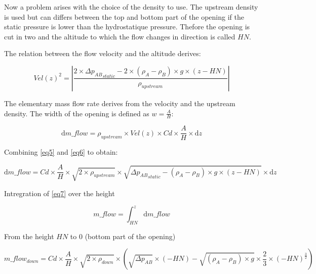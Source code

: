 \documentclass[a4paper, french]{article}
\begin{document}
            Now a problem arises with the choice of the density to use. The upstream density is used but can differs between the top and bottom part of the opening if the static pressure is lower than the hydrostatique pressure. Thefore the opening is cut in two and the altitude to which the flow changes in direction is called $ HN $.
            
            The relation between the flow velocity and the altitude derives:
            
            \begin{equation}
                \label{eq5}
                Vel(z)^2 = \left | \frac{2 \times \Delta {p_{AB}}_{static} - 2 \times (\rho_A - \rho_B) \times g \times (z-HN)}{\rho_{upstream} } \right |
            \end{equation}
            
            The elementary mass flow rate derives from the velocity and the upstream density. The width of the opening is defined as $ w = \frac{A}{H} $:
            
            \begin{equation}
                \label{eq6}
                \mathrm{d} m\_flow = \rho_{upstream} \times Vel(z) \times Cd \times \frac{A}{H} \times \mathrm{d} z
            \end{equation}
            
            Combining \eqref{eq5} and \eqref{eq6} to obtain:
            
            
            \begin{equation}
                \label{eq7}
                \mathrm{d} m\_flow = Cd \times \frac{A}{H} \times \sqrt{ 2 \times \rho_{upstream} } \times \sqrt{\Delta {p_{AB}}_{static} - ( \rho_A - \rho_B ) \times g \times (z - HN)} \times \mathrm{d} z
            \end{equation}
            
            Intregration of \eqref{eq7} over the height
            
            \begin{equation}
                \label{eq8}
                m\_flow = \int_{HN}^{z} \mathrm{d} m\_flow
            \end{equation}
            
            From the height $ HN $ to  $ 0 $  (bottom part of the opening)
            
            \begin{equation} 
            \label{eq9}
                m\_flow_{down} = Cd \times \frac{A}{H} \times \sqrt{ 2 \times \rho_{down}} \times \left( \sqrt{ \Delta {p_{AB}} } \times (- HN) - \sqrt{ ( \rho_A - \rho_B ) \times g } \times \frac{2}{3} \times {(-HN)}^\frac{3}{2} \right)
            \end{equation} 
            
\end{document}
